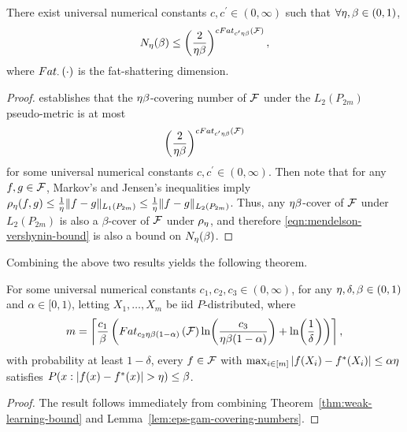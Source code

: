 \documentclass[12pt,a4paper,oneside,onecolumn]{book}
\begin{document}
\begin{lemma}
\label{lem:eps-gam-covering-numbers}
There exist universal numerical constants $c,c^{\prime} \in (0,\infty)$ such that $\forall \eta,\beta \in (0,1)$,  
\begin{equation*}
N_{\eta}(\beta) \leq \left(\frac{2}{\eta\beta}\right)^{c Fat_{c^{\prime} \eta \beta}\left(\mathcal{F}\right)},
\end{equation*}
where $Fat_{\cdot}\left(\cdot\right)$ is the fat-shattering dimension.
\end{lemma}
\begin{proof}
   \citet[Theorem 1]{MR1965359} establishes that 
the $\eta\beta$-covering number of $\mathcal{F}$ under the $L_{2}(P_{2m})$ pseudo-metric 
is at most 
\begin{equation}
\label{eqn:mendelson-vershynin-bound}
\left(\frac{2}{\eta\beta}\right)^{c Fat_{c^{\prime} \eta \beta}\left(\mathcal{F}\right)}
\end{equation}
for some universal numerical constants $c,c^{\prime} \in (0,\infty)$.
Then note that for any $f,g \in \mathcal{F}$, Markov's
and Jensen's inequalities imply
$\rho_{\eta}(f,g) \leq \frac{1}{\eta} \| f - g \|_{L_{1}(P_{2m})} \leq \frac{1}{\eta} \| f - g \|_{L_{2}(P_{2m})}$.
Thus, any $\eta\beta$-cover of $\mathcal{F}$ under $L_{2}(P_{2m})$ is also a $\beta$-cover of $\mathcal{F}$ under $\rho_{\eta}$,
and therefore \eqref{eqn:mendelson-vershynin-bound} is also a bound on $N_{\eta}(\beta)$.
\end{proof}

Combining the above two results yields the following theorem.

\begin{theorem}
\label{thm:eps-gam-weak-sample-complexity}
For some universal numerical constants $c_{1},c_{2},c_{3} \in (0,\infty)$, 
for any $\eta,\delta,\beta \in (0,1)$ and $\alpha \in [0,1)$,
letting $X_{1},\ldots,X_{m}$ be iid $P$-distributed, where 
\begin{equation*}
m = \left\lceil \frac{c_{1}}{\beta} \left(  Fat_{c_{2} \eta \beta (1-\alpha)}\left(\mathcal{F}\right) \ln\!\left( \frac{c_{3}}{\eta \beta (1-\alpha)} \right) + \ln\!\left(\frac{1}{\delta}\right) \right) \right\rceil, 
\end{equation*}
with probability at least $1-\delta$, every $f \in \mathcal{F}$ with $\max_{i \in [m]} |f(X_{i}) - f^{*}(X_{i})| \leq \alpha \eta$
satisfies $P( x : | f(x) - f^{*}(x) | > \eta ) \leq \beta$.
\end{theorem}
\begin{proof}
The result follows immediately from combining Theorem~\ref{thm:weak-learning-bound} and Lemma~\ref{lem:eps-gam-covering-numbers}.
\end{proof}
\end{document}
